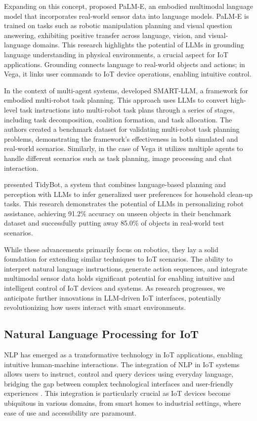 \documentclass{ieeeaccess}
\begin{document}
Expanding on this concept, \citet{10.5555/3618408.3618748} proposed PaLM-E, an embodied multimodal language model that incorporates real-world sensor data into language models. PaLM-E is trained on tasks such as robotic manipulation planning and visual question answering, exhibiting positive transfer across language, vision, and visual-language domains. This research highlights the potential of LLMs in grounding language understanding in physical environments, a crucial aspect for IoT applications. Grounding connects language to real-world objects and actions; in Vega, it links user commands to IoT device operations, enabling intuitive control.

In the context of multi-agent systems, \citet{kannan2024smartllmsmartmultiagentrobot} developed SMART-LLM, a framework for embodied multi-robot task planning. This approach uses LLMs to convert high-level task instructions into multi-robot task plans through a series of stages, including task decomposition, coalition formation, and task allocation. The authors created a benchmark dataset for validating multi-robot task planning problems, demonstrating the framework's effectiveness in both simulated and real-world scenarios. Similarly, in the case of Vega it utilizes multiple agents to handle different scenarios such as task planning, image processing and chat interaction.

\citet{Wu2023} presented TidyBot, a system that combines language-based planning and perception with LLMs to infer generalized user preferences for household clean-up tasks. This research demonstrates the potential of LLMs in personalizing robot assistance, achieving 91.2\% accuracy on unseen objects in their benchmark dataset and successfully putting away 85.0\% of objects in real-world test scenarios.

While these advancements primarily focus on robotics, they lay a solid foundation for extending similar techniques to IoT scenarios. The ability to interpret natural language instructions, generate action sequences, and integrate multimodal sensor data holds significant potential for enabling intuitive and intelligent control of IoT devices and systems. As research progresses, we anticipate further innovations in LLM-driven IoT interfaces, potentially revolutionizing how users interact with smart environments.

\subsection{Natural Language Processing for IoT}
NLP has emerged as a transformative technology in IoT applications, enabling intuitive human-machine interactions. The integration of NLP in IoT systems allows users to instruct, control and query devices using everyday language, bridging the gap between complex technological interfaces and user-friendly experiences \cite{10.1145/3643505}. This integration is particularly crucial as IoT devices become ubiquitous in various domains, from smart homes to industrial settings, where ease of use and accessibility are paramount.
\end{document}
